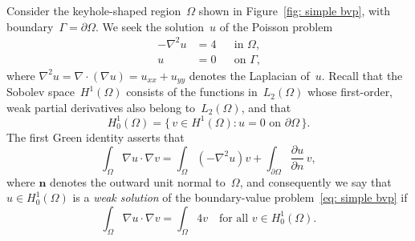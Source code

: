 \documentclass[a4paper,12pt]{article}
\begin{document}
Consider the keyhole-shaped region~$\Omega$ shown in 
Figure~\ref{fig: simple bvp}, with boundary~$\Gamma=\partial\Omega$.  
We seek the solution~$u$ of the Poisson problem
\begin{equation}\label{eq:  simple bvp}
\begin{aligned}
-\nabla^2 u&=4&&\text{in $\Omega$,}\\
u&=0&&\text{on $\Gamma$,}
\end{aligned}
\end{equation}
where $\nabla^2u=\nabla\cdot(\nabla u)=u_{xx}+u_{yy}$ denotes the 
Laplacian of~$u$. Recall that the Sobolev space~$H^1(\Omega)$ 
consists of the functions in~$L_2(\Omega)$ whose first-order, weak 
partial derivatives also belong to~$L_2(\Omega)$, and that 
\[
H^1_0(\Omega)=\{\,v\in H^1(\Omega):\text{$u=0$ on~$\partial\Omega$}
	\,\}.
\]
The first Green identity asserts that
\begin{equation}\label{eq: first Green}
\int_\Omega\nabla u\cdot\nabla v=\int_\Omega(-\nabla^2 u)v
	+\int_{\partial\Omega}\frac{\partial u}{\partial n}\,v,
\end{equation}
where $\boldsymbol{n}$ denotes the outward unit normal to~$\Omega$,
and consequently we say that $u\in H^1_0(\Omega)$ is a \emph{weak 
solution} of the boundary-value problem~\eqref{eq:  simple bvp} if
\begin{equation}\label{eq: weak bvp}
\int_\Omega\nabla u\cdot\nabla v=\int_\Omega 4v
	\quad\text{for all $v\in H^1_0(\Omega)$.}
\end{equation}
\end{document}

